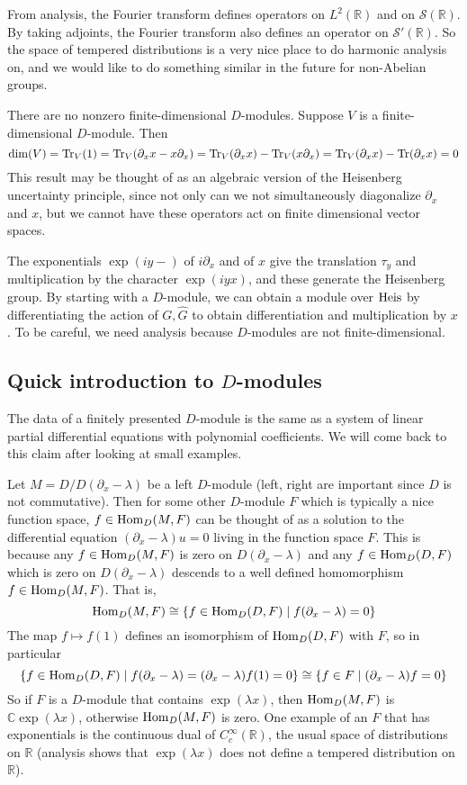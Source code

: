 \documentclass[../../rtnotes.tex]{subfiles}
\begin{document}
From analysis, the Fourier transform defines operators on $L^2(\mathbb R)$ and on $\mathcal S(\mathbb R)$. By taking adjoints, the Fourier transform also defines an operator on $\mathcal S'(\mathbb R)$. So the space of tempered distributions is a very nice place to do harmonic analysis on, and we would like to do something similar in the future for non-Abelian groups.

There are no nonzero finite-dimensional $D$-modules. Suppose $V$ is a finite-dimensional $D$-module. Then
\[\dim(V) = \Tr_V(1) = \Tr_V(\partial_xx-x\partial_x) = \Tr_V(\partial_xx)-\Tr_V(x\partial_x) = \Tr_V(\partial_xx)-\Tr(\partial_xx) = 0\]
This result may be thought of as an algebraic version of the Heisenberg uncertainty principle, since not only can we not simultaneously diagonalize $\partial_x$ and $x$, but we cannot have these operators act on finite dimensional vector spaces.

The exponentials $\exp(iy-)$ of $i\partial_x$ and of $x$ give the translation $\tau_{y}$ and multiplication by the character $\exp(iyx)$, and these generate the Heisenberg group. By starting with a $D$-module, we can obtain a module over $\operatorname{Heis}$ by differentiating the action of $G,\widehat G$ to obtain differentiation and multiplication by $x$. To be careful, we need analysis because $D$-modules are not finite-dimensional.

\subsection{Quick introduction to $D$-modules}
The data of a finitely presented $D$-module is the same as a system of linear partial differential equations with polynomial coefficients. We will come back to this claim after looking at small examples.

Let $M = D/D(\partial_x-\lambda)$ be a left $D$-module (left, right are important since $D$ is not commutative). Then for some other $D$-module $F$ which is typically a nice function space, $f\in \operatorname{Hom}_D(M,F)$ can be thought of as a solution to the differential equation $(\partial_x-\lambda)u = 0$ living in the function space $F$. This is because any $f\in \operatorname{Hom}_D(M,F)$ is zero on $D(\partial_x-\lambda)$ and any $f\in \operatorname{Hom}_D(D,F)$ which is zero on $D(\partial_x-\lambda)$ descends to a well defined homomorphism $f\in \operatorname{Hom}_D(M,F)$. That is, 
\[\operatorname{Hom}_D(M,F)\cong \{f\in \operatorname{Hom}_D(D,F)\mid f(\partial_x-\lambda) = 0\}\]
The map $f\mapsto f(1)$ defines an isomorphism of $\operatorname{Hom}_D(D,F)$ with $F$, so in particular 
\[\{f\in \operatorname{Hom}_D(D,F)\mid f(\partial_x-\lambda) = (\partial_x-\lambda)f(1) = 0\}\cong \{f\in F\mid (\partial_x-\lambda)f = 0\}\]
So if $F$ is a $D$-module that contains $\exp(\lambda x)$, then $\operatorname{Hom}_D(M,F)$ is $\mathbb C\exp(\lambda x)$, otherwise $\operatorname{Hom}_D(M,F)$ is zero. One example of an $F$ that has exponentials is the continuous dual of $C_c^\infty(\mathbb R)$, the usual space of distributions on $\mathbb R$ (analysis shows that $\exp(\lambda x)$ does not define a tempered distribution on $\mathbb R$).
\end{document}
